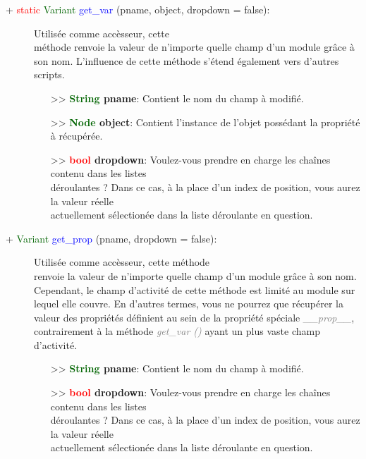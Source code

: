\documentclass[a4paper, 11pt]{article}
\begin{document}
	\begin{description}
		\item [+ \textcolor{red}{static} \textcolor{darkgreen}{Variant} \textcolor{blue}{get\_var} (pname, 
		object, dropdown = false):] Utilisée comme accèsseur, cette \\méthode renvoie la valeur de n'importe 
		quelle champ d'un module grâce à son nom. L'influence de cette méthode s'étend également vers 
		d'autres scripts.
		\begin{itemize}
			\item [>> \textbf{\textcolor{darkgreen}{String} pname}:] Contient le nom du champ à modifié.
			\item [>> \textbf{\textcolor{darkgreen}{Node} object}:] Contient l'instance de l'objet possédant
			la propriété à récupérée.
			\item [>> \textbf{\textcolor{red}{bool} dropdown}:] Voulez-vous prendre en charge les chaînes 
			contenu dans les listes \\déroulantes ? Dans ce cas, à la place d'un index de position, vous 
			aurez la valeur réelle \\actuellement sélectionée dans la liste déroulante en question.\\
		\end{itemize}
	\end{description}
	\begin{description}
		\item [+ \textcolor{darkgreen}{Variant} \textcolor{blue}{get\_prop} (pname, dropdown = false):] 
		Utilisée comme accèsseur, cette méthode \\renvoie la valeur de n'importe quelle champ d'un module 
		grâce à son nom. Cependant, le champ d'activité de cette méthode est limité au module sur lequel
		elle couvre. En d'autres termes, vous ne pourrez que récupérer la valeur des propriétés définient au 
		sein de la propriété spéciale \textit{\textcolor{gray}{\_\_prop\_\_}}, contrairement à la méthode 
		\textit{\textcolor{gray}{get\_var ()}} ayant un plus vaste champ d'activité.
		\begin{itemize}
			\item [>> \textbf{\textcolor{darkgreen}{String} pname}:] Contient le nom du champ à modifié.
			\item [>> \textbf{\textcolor{red}{bool} dropdown}:] Voulez-vous prendre en charge les chaînes 
			contenu dans les listes \\déroulantes ? Dans ce cas, à la place d'un index de position, vous 
			aurez la valeur réelle \\actuellement sélectionée dans la liste déroulante en question.\\
		\end{itemize}
	\end{description}
\end{document}
